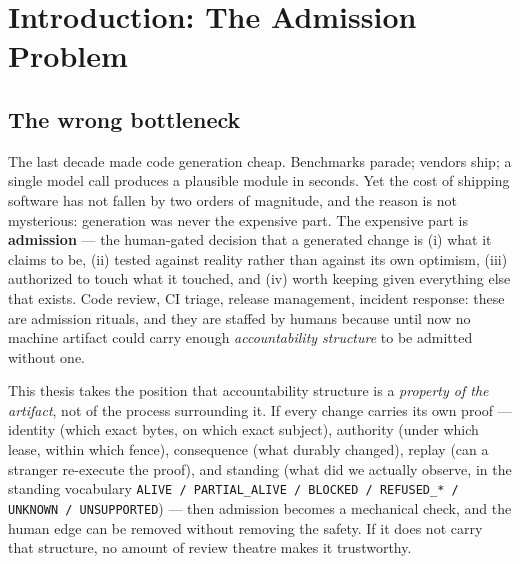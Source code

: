 \documentclass[11pt,a4paper]{article}
\theoremstyle{remark}
\newcommand{\Ostar}{$O^{*}$}
\newcommand{\term}[1]{\texttt{#1}}
\begin{document}
\begin{abstract}
The thesis contributes: (1) a type-theoretic reading of agent accountability in which ``the workflow ran'' is a category error; (2) a failure taxonomy that maps every observed defect to exactly one broken type term; (3) the wedge-and-reclaim invariant as a design pattern for work-conserving autonomy; (4) a measured account of provider throttling as a \emph{width} signal rather than a stop condition; and (5) a retirement metric for human supervision, reported as the count of things the human did not have to write. We give the loop three complementary formal readings: categorical (admission as a closure operator, manufacture as a faithful functor, closure by Knaster--Tarski), geometric (a provenance metric whose closed anchors define \Ostar{}, and the fabric as a hybrid dynamical system with a Lyapunov attraction theorem for the wedge law), and analytic (the retirement index as a convergent recursion and adaptive concurrency as a supermartingale control law). We conclude that the loop can be closed not by making the generator stronger, but by making refusal cheap, receipts mandatory, and honesty mechanical.
\end{abstract}

\newpage
\tableofcontents
\newpage

\section{Introduction: The Admission Problem}

\subsection{The wrong bottleneck}
The last decade made code generation cheap. Benchmarks parade; vendors ship; a single model call produces a plausible module in seconds. Yet the cost of shipping software has not fallen by two orders of magnitude, and the reason is not mysterious: generation was never the expensive part. The expensive part is \textbf{admission} --- the human-gated decision that a generated change is (i) what it claims to be, (ii) tested against reality rather than against its own optimism, (iii) authorized to touch what it touched, and (iv) worth keeping given everything else that exists. Code review, CI triage, release management, incident response: these are admission rituals, and they are staffed by humans because until now no machine artifact could carry enough \emph{accountability structure} to be admitted without one.

This thesis takes the position that accountability structure is a \emph{property of the artifact}, not of the process surrounding it. If every change carries its own proof --- identity (which exact bytes, on which exact subject), authority (under which lease, within which fence), consequence (what durably changed), replay (can a stranger re-execute the proof), and standing (what did we actually observe, in the standing vocabulary \term{ALIVE / PARTIAL\_ALIVE / BLOCKED / REFUSED\_* / UNKNOWN / UNSUPPORTED}) --- then admission becomes a mechanical check, and the human edge can be removed without removing the safety. If it does not carry that structure, no amount of review theatre makes it trustworthy.
\end{document}
